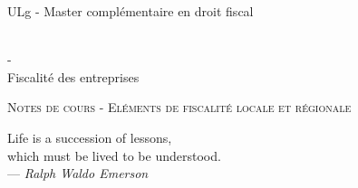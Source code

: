 \documentclass{book}
\begin{document}
\sffamily
\newcommand{\RPoint}{\protect\texttt{[image: point.png]}}
\newcommand{\RSave}{\protect\texttt{[image: Save.png]}}
\renewcommand\labelitemii{\ding{220}}
\begin{titlepage}

\begin{center}
\begin{Large}ULg - Master complémentaire en droit fiscal\end{Large}\\
\vspace{0.5cm}- \\
\vspace{0.5cm}
Fiscalité des entreprises

\end{center}
\vspace{6cm}

\LARGE
\begin{center}
\textsc{Notes de cours - Eléments de fiscalité locale et régionale}\\
\end{center}

\vspace{10.0cm}

\normalsize
{}

\end{titlepage}

\newpage

\thispagestyle{empty}
\setcounter{page}{0}
\null

\newpage
\thispagestyle{empty}
\setcounter{page}{0}
\vspace{20cm}

\vfill
\begin{flushright}
Life is a succession of lessons, \\
which must be lived to be understood. \\ 
--- \textit{Ralph Waldo Emerson}
\end{flushright}
\vfill
\newpage

\renewcommand{\chaptermark}[1]{\markboth{#1}{}}
\renewcommand{\sectionmark}[1]{\markright{\thesection\ #1}}
\fancyhf{} \fancyhead[LE,RO]{\bfseries\thepage}
\fancyhead[LO]{\bfseries\rightmark}
\fancyhead[RE]{\bfseries\leftmark}
\renewcommand{\headrulewidth}{0.5pt}
\addtolength{\headheight}{0.5pt}
\renewcommand{\footrulewidth}{0pt}
\fancypagestyle{plain}{ \fancyhead{}
\renewcommand{\headrulewidth}{0pt}}
\end{document}
